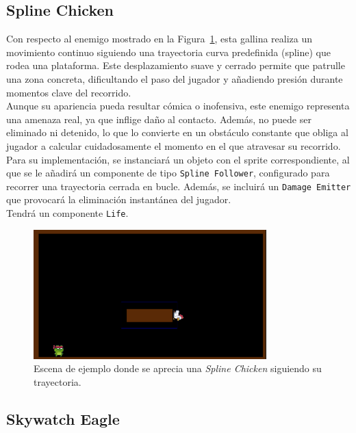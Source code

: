 \subsection{Spline Chicken}

Con respecto al enemigo mostrado en la Figura~\ref{fig:SplineChicken}, esta gallina realiza un movimiento continuo siguiendo una trayectoria curva predefinida (spline) que rodea una plataforma. Este desplazamiento suave y cerrado permite que patrulle una zona concreta, dificultando el paso del jugador y añadiendo presión durante momentos clave del recorrido.\\

Aunque su apariencia pueda resultar cómica o inofensiva, este enemigo representa una amenaza real, ya que inflige daño al contacto. Además, no puede ser eliminado ni detenido, lo que lo convierte en un obstáculo constante que obliga al jugador a calcular cuidadosamente el momento en el que atravesar su recorrido.\\

Para su implementación, se instanciará un objeto con el sprite correspondiente, al que se le añadirá un componente de tipo \texttt{Spline Follower}, configurado para recorrer una trayectoria cerrada en bucle. Además, se incluirá un \texttt{Damage Emitter} que provocará la eliminación instantánea del jugador.\\

Tendrá un componente \texttt{Life}.

\begin{figure}[t]
	\centering
	\includegraphics[height=5cm]{Imagenes/Gallina_Spline.png}
	\caption{Escena de ejemplo donde se aprecia una \textit{Spline Chicken} siguiendo su trayectoria.}
	\label{fig:SplineChicken}
\end{figure}

\subsection{Skywatch Eagle}

